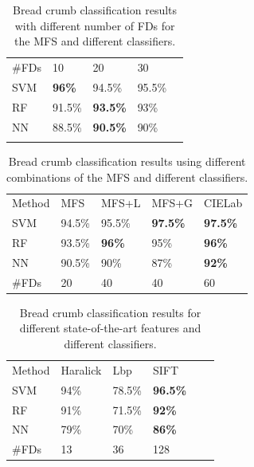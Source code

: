 \documentclass[spanish,a4paper,openright,11pt]{book}
\begin{document}
\begin{table}[h!]
\caption{Bread crumb classification results with different number of FDs for the MFS and different classifiers.}
\label{tab:number}       %
\begin{tabular}{lllll}
\hline\noalign{\smallskip}
\#FDs & 10  & 20 & 30 \\
\noalign{\smallskip}\hline\noalign{\smallskip}
SVM & \textbf{96\%} & 94.5\% & 95.5\% \\
RF  & 91.5\% & \textbf{93.5\%} & 93\% \\
NN & 88.5\% & \textbf{90.5\%} & 90\% \\
\noalign{\smallskip}\hline
\end{tabular}
\end{table}


\begin{table}[h!]
\caption{Bread crumb classification results using different combinations of the MFS and different classifiers.}
\label{tab:mfs}       %
\begin{tabular}{lllll}
\hline\noalign{\smallskip}
Method & MFS & MFS+L & MFS+G & CIELab  \\
\noalign{\smallskip}\hline\noalign{\smallskip}
SVM & 94.5\% & 95.5\% & \textbf{97.5\%} & \textbf{97.5\%} \\
RF  & 93.5\% & \textbf{96\%} & 95\% & \textbf{96\%} \\
NN & 90.5\% & 90\% & 87\% & \textbf{92\%} \\
\noalign{\smallskip}\hline
\#FDs & 20 & 40 & 40 & 60 \\
\hline
\end{tabular}
\end{table}

\begin{table}[h!]
\caption{Bread crumb classification results for different state-of-the-art features and different classifiers.}
\label{tab:other}       %
\begin{tabular}{llllll}
\hline\noalign{\smallskip}
Method & Haralick & Lbp & SIFT\\ %
\noalign{\smallskip}\hline\noalign{\smallskip}
SVM & 94\% & 78.5\% & \textbf{96.5\%} \\ %
RF  & 91\% & 71.5\% & \textbf{92\%} \\ %
NN & 79\% & 70\% & \textbf{86\%} \\ %
\noalign{\smallskip}\hline
\#FDs & 13 & 36 & 128 \\
\hline
\end{tabular}
\end{table}
\end{document}
